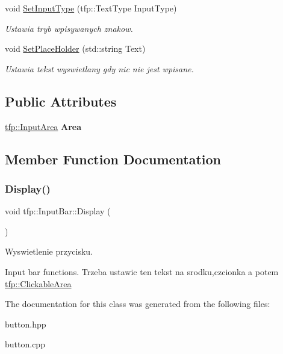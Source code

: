 \begin{DoxyCompactItemize}
void \mbox{\hyperlink{classtfp_1_1_input_bar_a167e0c704af4ee7e60a3b9ff83d93838}{Set\+Input\+Type}} (tfp\+::\+Text\+Type Input\+Type)
\begin{DoxyCompactList}\small\item\em Ustawia tryb wpisywanych znakow. \end{DoxyCompactList}\item 
\mbox{\label{classtfp_1_1_input_bar_a6bfd9176bc7b1daa0501ed431246b117}} 
void \mbox{\hyperlink{classtfp_1_1_input_bar_a6bfd9176bc7b1daa0501ed431246b117}{Set\+Place\+Holder}} (std\+::string Text)
\begin{DoxyCompactList}\small\item\em Ustawia tekst wyswietlany gdy nic nie jest wpisane. \end{DoxyCompactList}\end{DoxyCompactItemize}
\subsection*{Public Attributes}
\begin{DoxyCompactItemize}
\item 
\mbox{\label{classtfp_1_1_input_bar_af0799874beb4e56e78fcb751108fd07b}} 
\mbox{\hyperlink{classtfp_1_1_input_area}{tfp\+::\+Input\+Area}} {\bfseries Area}
\end{DoxyCompactItemize}


\subsection{Member Function Documentation}
\mbox{\label{classtfp_1_1_input_bar_a1ca3dc45cea59e824be74286f02faf91}} 
\subsubsection{\texorpdfstring{Display()}{Display()}}
{\footnotesize\ttfamily void tfp\+::\+Input\+Bar\+::\+Display (\begin{DoxyParamCaption}{ }\end{DoxyParamCaption})}



Wyswietlenie przycisku. 

Input bar functions. Trzeba ustawic ten tekst na srodku,czcionka a potem \mbox{\hyperlink{classtfp_1_1_clickable_area}{tfp\+::\+Clickable\+Area}} 

The documentation for this class was generated from the following files\+:\begin{DoxyCompactItemize}
\item 
button.\+hpp\item 
button.\+cpp\end{DoxyCompactItemize}
